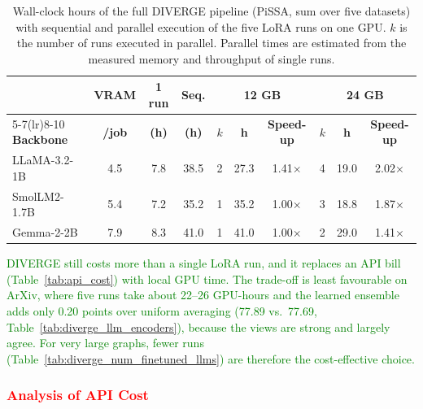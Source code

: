 \documentclass[a4paper,fleqn]{cas-sc}
\newcommand{\revone}[1]{\textcolor{red}{#1}}   %
\newcommand{\revthree}[1]{\textcolor{green}{#1}} %
\begin{document}
\begin{table}[htbp]
\centering\color{blue}
\caption{Wall-clock hours of the full DIVERGE pipeline (PiSSA, sum over five datasets) with sequential and parallel execution of the five LoRA runs on one GPU. $k$ is the number of runs executed in parallel. Parallel times are estimated from the measured memory and throughput of single runs.}
\label{tab:parallel}
\small
\setlength{\tabcolsep}{3pt}
\begin{tabular*}{\columnwidth}{@{\extracolsep{\fill}} lccccccccc @{}}
\toprule
 & \textbf{VRAM} & \textbf{1 run} & \textbf{Seq.} & \multicolumn{3}{c}{\textbf{12 GB}} & \multicolumn{3}{c}{\textbf{24 GB}} \\
\cmidrule(lr){5-7}\cmidrule(lr){8-10}
\textbf{Backbone} & \textbf{/job} & \textbf{(h)} & \textbf{(h)} & $k$ & \textbf{h} & \textbf{Speed-up} & $k$ & \textbf{h} & \textbf{Speed-up} \\
\midrule
LLaMA-3.2-1B & 4.5 & 7.8 & 38.5 & 2 & 27.3 & 1.41$\times$ & 4 & 19.0 & 2.02$\times$ \\
SmolLM2-1.7B & 5.4 & 7.2 & 35.2 & 1 & 35.2 & 1.00$\times$ & 3 & 18.8 & 1.87$\times$ \\
Gemma-2-2B & 7.9 & 8.3 & 41.0 & 1 & 41.0 & 1.00$\times$ & 2 & 29.0 & 1.41$\times$ \\
\bottomrule
\end{tabular*}
\end{table}

\revthree{DIVERGE still costs more than a single LoRA run, and it replaces an API bill (Table~\ref{tab:api_cost}) with local GPU time. The trade-off is least favourable on ArXiv, where five runs take about 22--26 GPU-hours and the learned ensemble adds only 0.20 points over uniform averaging (77.89 vs.\ 77.69, Table~\ref{tab:diverge_llm_encoders}), because the views are strong and largely agree. For very large graphs, fewer runs (Table~\ref{tab:diverge_num_finetuned_llms}) are therefore the cost-effective choice.}

\subsubsection{\revone{Analysis of API Cost}}\label{sec:api_cost}
\end{document}
